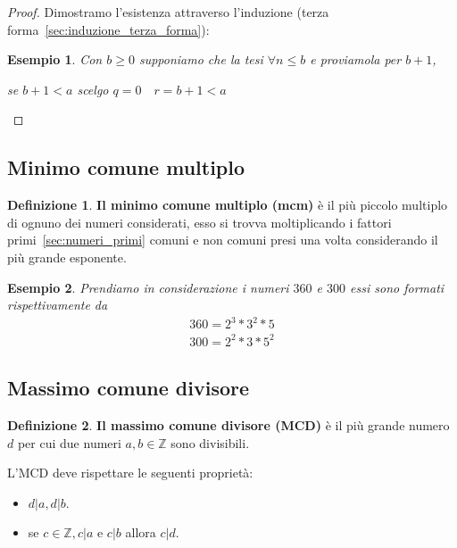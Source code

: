 \documentclass{article}
\newtheorem{exmp}{Esempio}[section]
\theoremstyle{definition}
\newtheorem{definition}{Definizione}[section]
\begin{document}
\begin{tcolorbox}
\begin{proof}
       Dimostramo l'esistenza attraverso l'induzione (terza forma~\ref{sec:induzione_terza_forma}):\newline
       \begin{exmp}
             Con $ b \ge 0 $ supponiamo che la tesi $ \forall n \le b   $  e proviamola per $ b + 1 $, \par
             se $ b + 1 < a$ scelgo $ q = 0 \quad r = b + 1 < a $  
       \end{exmp}  
\end{proof}
\end{tcolorbox}




\subsection{Minimo comune multiplo}\label{sec:mcm}
\begin{definition}
        \textbf{Il minimo comune multiplo (mcm)} è il più piccolo multiplo di ognuno dei numeri considerati, esso si trovva moltiplicando i fattori primi~\ref{sec:numeri_primi} comuni e non comuni presi una volta considerando il più grande esponente.  
\end{definition}
\begin{exmp}
        Prendiamo in considerazione i numeri $ 360 $ e $ 300 $ essi sono formati rispettivamente da
        \begin{align*}
                360 = 2^3 * 3^2 * 5 \\
                300 = 2^2 * 3 * 5^2 
        \end{align*}
\end{exmp}


\subsection{Massimo comune divisore}\label{sec:MCD}
\begin{definition}
        \textbf{Il massimo comune divisore (MCD)} è il più grande numero $ d $ per cui due numeri $ a,b \in \mathbb{Z} $ sono divisibili.
\end{definition}
L'MCD deve rispettare le seguenti proprietà:
\begin{itemize}
        \item $ d | a, d | b $.
        \item se $c \in \mathbb{Z}, c | a$ e $ c | b $ allora $ c | d $.
\end{itemize}
\end{document}
